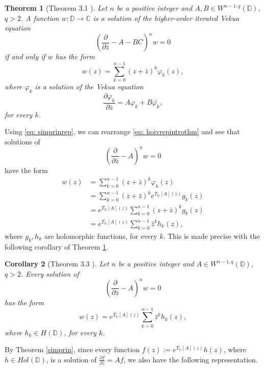 \documentclass[12pt,reqno]{amsart}
\newtheorem{theorem}{Theorem}[section]
\newtheorem{corr}[theorem]{Corollary}
\theoremstyle{definition}
\theoremstyle{remark}
\newcommand{\p}{\partial}
\newcommand{\z}{\bar z}
\newcommand{\disk}{\mathbb{D}}
\begin{document}
            \begin{theorem}[Theorem 3.1 \cite{WBD}]\label{thm: wbdrep}
                Let $n$ be a positive integer and $A, B \in W^{n-1, q}(\disk)$, $q>2$. A function $w :\disk\to\mathbb{C}$ is a solution of the higher-order iterated Vekua equation 
                \[
                \left( \frac{\p}{\p\z} - A- BC\right)^n w = 0
                \]
                if and only if $w$ has the form 
                \begin{equation}\label{eq: hoivrepintrothm}
                    w(z) = \sum_{k=0}^{n-1} (z+\z)^k \varphi_k(z),
                \end{equation}
                where $\varphi_k$ is a solution of the Vekua equation
                \[
                    \frac{\p \varphi_k}{\p\z} = A \varphi_k + B\overline{\varphi_k},
                \]
                for every $k$.
            \end{theorem}

             Using \eqref{eq: simprinrep}, we can rearrange \eqref{eq: hoivrepintrothm} and see that solutions of 
            \[
                \left( \frac{\p}{\p\z} - A \right)^n w = 0
            \]
            have the form 
            \begin{align*}
                w(z) &= \sum_{k=0}^{n-1} (z+\z)^k \varphi_k(z)\\
                &= \sum_{k=0}^{n-1} (z+\z)^k e^{T_\disk[A](z)} g_k(z)  \\
                &= e^{T_\disk[A](z)} \sum_{k=0}^{n-1} (z+\z)^k  g_k(z) \\
                &= e^{T_\disk[A](z)} \sum_{k=0}^{n-1} \z^k h_k(z),
            \end{align*}
            where $g_k, h_k$ are holomorphic functions, for every $k$. This is made precise with the following corollary of Theorem \ref{thm: wbdrep}. 

            \begin{corr}[Theorem 3.3 \cite{WB3}]\label{corr: hoivrepbzero}
                Let $n$ be a positive integer and $A \in W^{n-1, q}(\disk)$, $q>2$. Every solution of 
                \[
                     \left( \frac{\p}{\p\z} - A \right)^n w = 0
                \]  
                has the form 
                \[
                    w(z) = e^{T_\disk[A](z)}\sum_{k=0}^{n-1} \z^k h_k(z),
                \]
                where $h_k \in H(\disk)$, for every $k$. 
            \end{corr}

            By Theorem \ref{simprin}, since every function $f(z) := e^{T_\disk[A](z)}h(z)$, where $h \in Hol(\disk)$, is a solution of $\frac{\p f}{\p\z} = Af$, we also have the following representation. 
\end{document}
